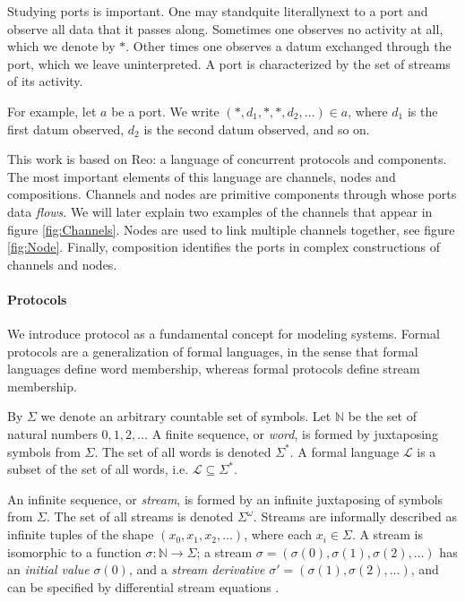 Studying ports is important.
One may stand\textemdash quite literally\textemdash next to a port and observe all data that it passes along.
Sometimes one observes no activity at all, which we denote by $*$.
Other times one observes a datum exchanged through the port, which we leave uninterpreted.
A port is characterized by the set of streams of its activity.

For example, let $a$ be a port. We write $(*,d_{1},*,*,d_{2},\ldots)\in a$, where $d_{1}$ is the first datum observed, $d_{2}$ is the second datum observed, and so on.

This work is based on Reo: a language of concurrent protocols and components.
The most important elements of this language are channels, nodes and compositions.
Channels and nodes are primitive components through whose ports data \emph{flows}.
We will later explain two examples of the channels that appear in figure \ref{fig:Channels}.
Nodes are used to link multiple channels together, see figure \ref{fig:Node}.
Finally, composition identifies the ports in complex constructions of channels and nodes.

\paragraph{Protocols}

We introduce protocol as a fundamental concept for modeling systems.
Formal protocols are a generalization of formal languages,
in the sense that formal languages define word membership,
whereas formal protocols define stream membership.

By $\Sigma$ we denote an arbitrary countable set of symbols.
Let $\mathbb{N}$ be the set of natural numbers ${0,1,2,\ldots}$
A finite sequence, or \emph{word}, is formed by juxtaposing symbols from $\Sigma$.
The set of all words is denoted $\Sigma^{*}$.
A formal language $\mathcal{L}$ is a subset of the set of all words,
i.e. $\mathcal{L}\subseteq\Sigma^{*}$.

An infinite sequence, or \emph{stream}, is formed by an infinite juxtaposing of symbols from $\Sigma$.
The set of all streams is denoted $\Sigma^{\omega}$.
Streams are informally described as infinite tuples
of the shape $(x_{0},x_{1},x_{2},\ldots)$, where each $x_i \in \Sigma$.
A stream is isomorphic to a function $\sigma:\mathbb{N}\to\Sigma$;
a stream $\sigma = (\sigma(0),\sigma(1),\sigma(2),\ldots)$ has
an \emph{initial value} $\sigma(0)$,
and a \emph{stream derivative} $\sigma' = (\sigma(1),\sigma(2),\ldots)$,
and can be specified by differential stream equations \cite{?}.

